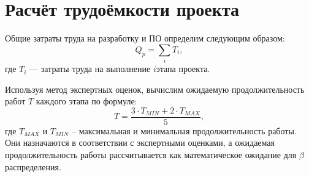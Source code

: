 \section{Расчёт трудоёмкости проекта} \label{economics_laboriousness}

Общие затраты труда на разработку и ПО определим следующим образом:
\begin{equation}
  \label{eq:common_laboriousness}
Q_p = \sum_{i} T_i,
\end{equation}
где $T_i$ --- затраты труда на выполнение $i$ этапа проекта.

Используя метод экспертных оценок, вычислим ожидаемую продолжительность работ $T$ каждого этапа по формуле:
\begin{equation}
  \label{eq:work_duration}
T = \frac {3 \cdot T_{MIN} + 2 \cdot T_{MAX}} {5},
\end{equation}
где $T_{MAX}$ и $T_{MIN}$ – максимальная и минимальная продолжительность работы. Они назначаются в соответствии с экспертными оценками, а ожидаемая продолжительность работы рассчитывается как математическое ожидание для $\beta$\ndash распределения.

